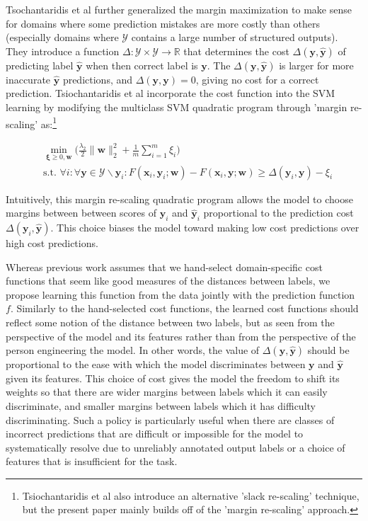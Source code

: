 \documentclass{article} %
\begin{document}
Tsochantaridis et al further generalized the margin maximization
to make sense for domains where some prediction mistakes are more 
costly than others (especially domains where $\mathcal{Y}$ contains
a large number of structured outputs).  They introduce a function 
$\Delta:\mathcal{Y}\times\mathcal{Y}\rightarrow\mathbb{R}$ that
determines the cost
$\Delta(\mathbf{y},\mathbf{\hat{y}})$ of predicting label 
$\mathbf{\hat{y}}$ when then correct label is $\mathbf{y}$.  
The $\Delta(\mathbf{y},\mathbf{\hat{y}})$ is larger for more 
inaccurate $\mathbf{\hat{y}}$ predictions, and 
$\Delta(\mathbf{y},\mathbf{y})=0$, giving no cost for a correct
prediction. Tsiochantaridis et al incorporate 
the cost function into the SVM learning by modifying the 
multiclass SVM quadratic
program through 'margin re-scaling' as:\footnote{Tsiochantaridis et al 
also introduce an alternative 'slack re-scaling' technique, but the 
present paper mainly builds off of the 'margin re-scaling' approach.}

\begin{equation}
\label{marginRescaling}
\begin{split}
& \min_{\mathbf{\xi}\geq 0, \mathbf{w}}\big(\frac{\lambda_2}{2}\|\mathbf{w}\|_2^2+\frac{1}{m}\sum_{i=1}^m\xi_i\big) \\
& \text{s.t.     } \forall i : \forall \mathbf{y}\in\mathcal{Y}\backslash\mathbf{y}_i : F(\mathbf{x}_i,\mathbf{y}_i;\mathbf{w})-F(\mathbf{x}_i,\mathbf{y};\mathbf{w})\geq \Delta(\mathbf{y}_i,\mathbf{y})-\xi_i
\end{split}
\end{equation}

Intuitively, this margin re-scaling quadratic program allows 
the model to choose margins between between scores of 
$\mathbf{y}_i$ and $\mathbf{\hat{y}}_i$  proportional to
the prediction cost $\Delta(\mathbf{y}_i,\mathbf{\hat{y}})$.
This choice biases the model toward making low cost 
predictions over high cost predictions.

Whereas previous work assumes that we hand-select 
domain-specific cost functions that seem like 
good measures of the distances between labels, we
propose learning this function from the data jointly with
the prediction function $f$.  Similarly to the hand-selected
cost functions, the learned cost functions
should reflect some notion of the distance between two
labels, but as seen from the perspective of the model and its
features rather than from the perspective of the person 
engineering the model. In other words, the value of 
$\Delta(\mathbf{y}, \mathbf{\hat{y}})$ should
be proportional to the ease with which the model  
discriminates between $\mathbf{y}$ and $\mathbf{\hat{y}}$
given its features.  This choice of cost gives the model the
freedom to shift its weights so that there are wider margins
between labels which it can easily discriminate, and smaller
margins between labels which it has difficulty discriminating.
Such a policy is particularly useful when there are classes
of incorrect predictions that are difficult or impossible for 
the model to systematically resolve due to unreliably 
annotated output labels or a 
choice of features that is insufficient for the task.
\end{document}
